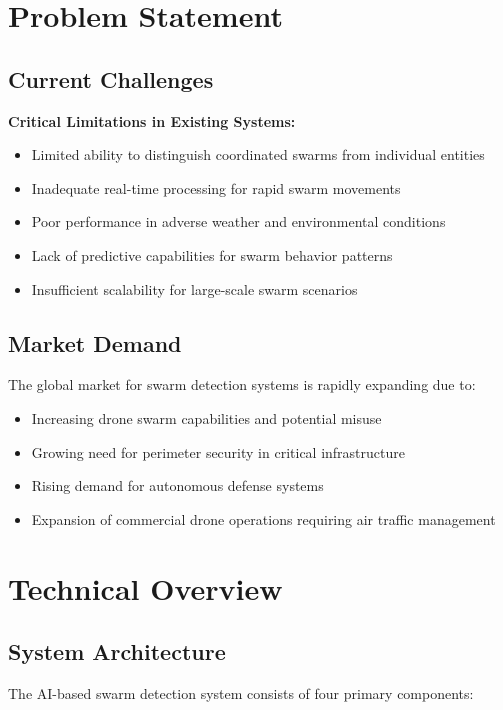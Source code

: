 \documentclass[11pt,a4paper]{article}
\begin{document}
\section{Problem Statement}

\subsection{Current Challenges}
\begin{warning}
\textbf{Critical Limitations in Existing Systems:}
\begin{itemize}
    \item Limited ability to distinguish coordinated swarms from individual entities
    \item Inadequate real-time processing for rapid swarm movements
    \item Poor performance in adverse weather and environmental conditions
    \item Lack of predictive capabilities for swarm behavior patterns
    \item Insufficient scalability for large-scale swarm scenarios
\end{itemize}
\end{warning}

\subsection{Market Demand}
The global market for swarm detection systems is rapidly expanding due to:
\begin{itemize}[leftmargin=2em]
    \item Increasing drone swarm capabilities and potential misuse
    \item Growing need for perimeter security in critical infrastructure
    \item Rising demand for autonomous defense systems
    \item Expansion of commercial drone operations requiring air traffic management
\end{itemize}

\section{Technical Overview}

\subsection{System Architecture}
The AI-based swarm detection system consists of four primary components:
\end{document}
